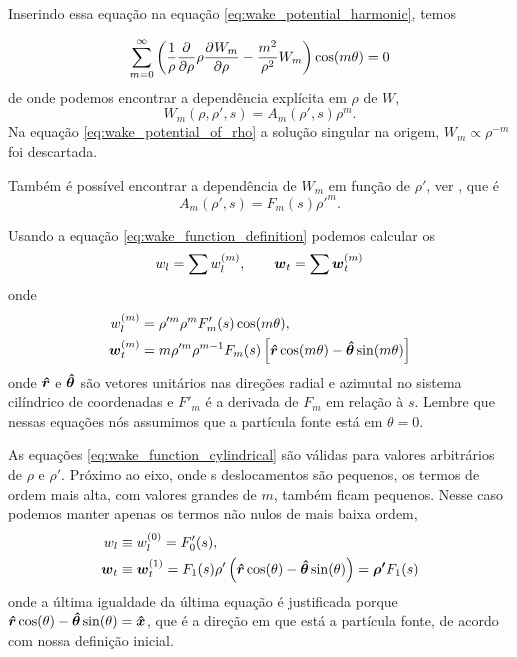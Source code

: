 Inserindo essa equação na equação \eqref{eq:wake_potential_harmonic}, temos

\begin{equation}
	\sum_{m=0}^\infty \left(\frac1\rho\frac{\partial^{{}}}{\partial \rho^{{}}}\rho\frac{\partial^{{}}W_m}{\partial \rho^{{}}} - 
    					    \frac{m^2}{\rho^2}W_m\right)\cos(m\theta) = 0
\end{equation}
de onde podemos encontrar a dependência explícita em $\rho$ de $W$,
\begin{equation}\label{eq:wake_potential_of_rho}
	W_m(\rho,\rho',s) = A_m(\rho',s)\rho^m.
\end{equation}
Na equação \eqref{eq:wake_potential_of_rho} a solução singular na origem, $W_m \propto \rho^{-m}$ foi descartada.

Também é possível encontrar a dependência de $W_m$ em função de $\rho'$,  ver \cite{Bane_PAC1983}, que é
\begin{equation}
	A_m(\rho',s) = F_m(s)\rho'^m.
\end{equation}

Usando a equação \eqref{eq:wake_function_definition} podemos calcular os 
\begin{equation}
	w_l = \sum w_l^{(m)}, \qquad \boldsymbol{w}_t = \sum \boldsymbol{w}_t^{(m)}
\end{equation}
onde
\begin{equation}\label{eq:wake_function_cylindrical}\begin{aligned}
w_l^{(m)} &= \rho'^m\rho^mF'_m(s)\cos(m\theta),\\
\boldsymbol{w}_t^{(m)} &= m\rho'^m\rho^{m-1} F_m(s)\left[\boldsymbol{\hat{r}}\cos(m\theta) - 
												  \boldsymbol{\hat{\theta}}\sin(m\theta)\right]
\end{aligned}\end{equation}
onde $\boldsymbol{\hat{r}}$ e $\boldsymbol{\hat{\theta}}$ são vetores unitários nas direções radial e azimutal no sistema cilíndrico de coordenadas e $F'_m$ é a derivada de $F_m$ em relação à $s$. Lembre que nessas equações nós assumimos que a partícula fonte está em $\theta = 0$.

As equações \eqref{eq:wake_function_cylindrical} são válidas para valores arbitrários de $\rho$ e $\rho'$. Próximo ao eixo, onde s deslocamentos são pequenos, os termos de ordem mais alta, com valores grandes de $m$, também ficam pequenos. Nesse caso podemos manter apenas os termos não nulos de mais baixa ordem,
\begin{equation}\label{eq:wake_function_expanded}\begin{aligned}
	w_l & \equiv w_l^{(0)} = F'_0(s), \\
    \boldsymbol{w}_t & \equiv \boldsymbol{w}_t^{(1)} = F_1(s)\rho'\left(\boldsymbol{\hat{r}}\cos(\theta) - \boldsymbol{\hat{\theta}}\sin(\theta)\right) = \boldsymbol{\rho'} F_1(s)
\end{aligned}\end{equation}
onde a última igualdade da última equação é justificada porque $\boldsymbol{\hat{r}}\cos(\theta) - \boldsymbol{\hat{\theta}}\sin(\theta) = \boldsymbol{\hat{x}}$, que é a direção em que está a partícula fonte, de acordo com nossa definição inicial. 

